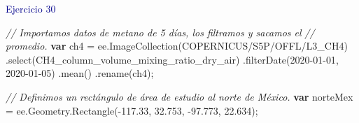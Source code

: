 \documentclass[
  12pt,
  letterpaper,
  twoside]{book}
\newenvironment{Shaded}{\begin{snugshade}}{\end{snugshade}}
\newcommand{\AttributeTok}[1]{\textcolor[rgb]{0.48,0.12,0.64}{#1}}
\newcommand{\CommentTok}[1]{\textcolor[rgb]{0.24,0.58,0.00}{\textit{#1}}}
\newcommand{\FloatTok}[1]{\textcolor[rgb]{0.28,0.53,0.93}{#1}}
\newcommand{\FunctionTok}[1]{\textcolor[rgb]{0.48,0.12,0.64}{#1}}
\newcommand{\KeywordTok}[1]{\textcolor[rgb]{0.00,0.00,0.00}{\textbf{#1}}}
\newcommand{\NormalTok}[1]{#1}
\newcommand{\OperatorTok}[1]{\textcolor[rgb]{0.00,0.00,0.00}{#1}}
\newcommand{\StringTok}[1]{\textcolor[rgb]{0.87,0.29,0.22}{#1}}
\begin{document}
\textcolor{darkblue}{Ejercicio 30}

\begin{Shaded}
\begin{Highlighting}[]
\CommentTok{// Importamos datos de metano de 5 días, los filtramos y sacamos el }
\CommentTok{// promedio.}
\KeywordTok{var}\NormalTok{ ch4 }\OperatorTok{=}\NormalTok{ ee}\OperatorTok{.}\FunctionTok{ImageCollection}\NormalTok{(}\StringTok{\textquotesingle{}COPERNICUS/S5P/OFFL/L3\_CH4\textquotesingle{}}\NormalTok{)}
  \OperatorTok{.}\FunctionTok{select}\NormalTok{(}\StringTok{\textquotesingle{}CH4\_column\_volume\_mixing\_ratio\_dry\_air\textquotesingle{}}\NormalTok{)}
  \OperatorTok{.}\FunctionTok{filterDate}\NormalTok{(}\StringTok{\textquotesingle{}2020{-}01{-}01\textquotesingle{}}\OperatorTok{,} \StringTok{\textquotesingle{}2020{-}01{-}05\textquotesingle{}}\NormalTok{)}
  \OperatorTok{.}\FunctionTok{mean}\NormalTok{()}
  \OperatorTok{.}\FunctionTok{rename}\NormalTok{(}\StringTok{\textquotesingle{}ch4\textquotesingle{}}\NormalTok{)}\OperatorTok{;}

\CommentTok{// Definimos un rectángulo de área de estudio al norte de México.}
\KeywordTok{var}\NormalTok{ norteMex }\OperatorTok{=}
\NormalTok{  ee}\OperatorTok{.}\AttributeTok{Geometry}\OperatorTok{.}\FunctionTok{Rectangle}\NormalTok{(}\OperatorTok{{-}}\FloatTok{117.33}\OperatorTok{,} \FloatTok{32.753}\OperatorTok{,} \OperatorTok{{-}}\FloatTok{97.773}\OperatorTok{,} \FloatTok{22.634}\NormalTok{)}\OperatorTok{;}


\end{Highlighting}
\end{Shaded}
\end{document}
